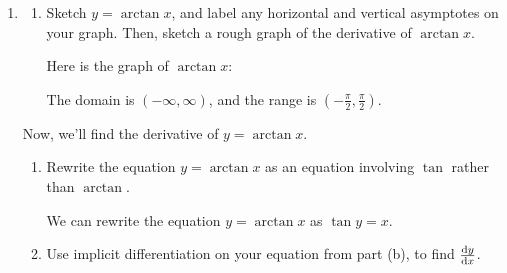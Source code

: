 \documentclass[main]{subfiles}
\begin{document}
\begin{enumerate}
\item 
  \begin{enumerate}
  \item
    \begin{problem}[\vfill]
      Sketch $y = \arctan x$, and label any horizontal and vertical
      asymptotes on your graph.  Then, sketch a rough graph of the
      derivative of $\arctan x$.
    \end{problem}

    \begin{solution}
      Here is the graph of $\arctan x$:
      \begin{center}
      \end{center}
      The domain is $(-\infty, \infty)$, and the range is
      $\left(-\frac{\pi}{2}, \frac{\pi}{2} \right)$.
    \end{solution}

  \end{enumerate}
  Now, we'll find the derivative of $y = \arctan x$.  
  \begin{enumerate}[resume]
  \item
    \begin{problem}[0.25in]
      Rewrite the equation $y = \arctan x$ as an equation involving
      $\tan$ rather than $\arctan$.
    \end{problem}

    \begin{solution}
      We can rewrite the equation $y = \arctan x$ as $\tan y = x$.  
    \end{solution}

  \item
    \begin{problem}[1in]
      Use implicit differentiation on your equation from part (b),
      to find $\diff yx$. 
      
      
    \end{problem}


\end{enumerate}
\end{enumerate}
\end{document}
